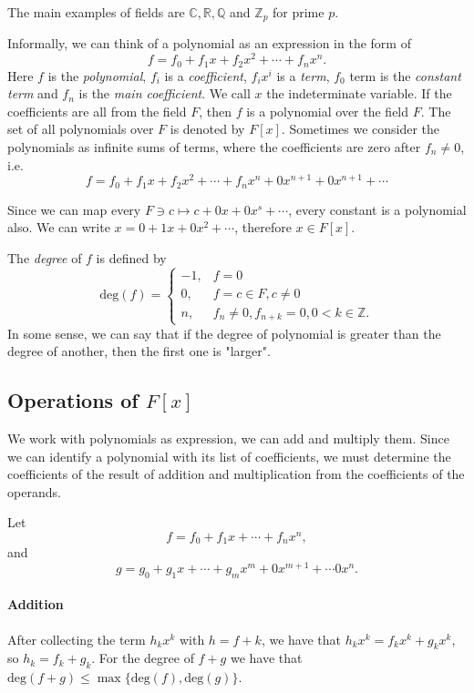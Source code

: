 \documentclass{article}
\newcommand{\Z}{\mathbb{Z}}
\begin{document}
The main examples of fields are $\mathbb{C}, \mathbb{R}, \mathbb{Q}$ and $\Z_p$ for prime $p$.

Informally, we can think of a polynomial as an expression in the form of
\[
    f = f_0 + f_1 x + f_2 x^2 + \cdots + f_n x^n.
\]
Here $f$ is the \emph{polynomial}, $f_i$ is a \emph{coefficient}, $f_i x^i$ is a \emph{term}, $f_0$ term is the \emph{constant term} and $f_n$ is the \emph{main coefficient}.
We call $x$ the indeterminate variable. If the coefficients are all from the field $F$, then $f$ is a polynomial over the field $F$.
The set of all polynomials over $F$ is denoted by $F[x]$. 
Sometimes we consider the polynomials as infinite sums of terms, where the coefficients are zero after $f_n \neq 0$, i.e.
\[
    f = f_0 + f_1 x + f_2 x^2 + \cdots + f_n x^n + 0x^{n+1} + 0x^{n+1} + \cdots
\]

Since we can map every $F \ni c \mapsto c + 0x + 0x^s + \cdots$, every constant is a polynomial also.
We can write $x = 0 + 1x + 0x^2 + \cdots$, therefore $x \in F[x]$.

The \emph{degree} of $f$ is defined by
\[
    \mathrm{deg}(f) = \begin{cases}
        -1, & f = 0 \\
        0, & f = c \in F, c \neq 0 \\
        n, & f_n \neq 0, f_{n+k} = 0, 0 < k \in \Z.
    \end{cases}
\]
In some sense, we can say that if the degree of polynomial is greater than the degree of another, then the first one is "larger".

\subsection{Operations of $F[x]$}

We work with polynomials as expression, we can add and multiply them.
Since we can identify a polynomial with its list of coefficients, we must determine the coefficients of the result of addition and multiplication from the coefficients of the operands.

Let 
\[
    f = f_0 + f_1 x + \cdots + f_n x^n,
\]
and
\[
    g = g_0 + g_1 x + \cdots + g_m x^m + 0x^{m+1} + \cdots 0x^n.
\]

\paragraph{Addition}
After collecting the term $h_k x^k$ with $h=f+k$, we have that $h_k x^k = f_k x^k + g_k x^k$, so $h_k = f_k + g_k$.
For the degree of $f+g$ we have that $\mathrm{deg}(f+g) \le \max \{ \mathrm{deg}(f), \mathrm{deg}(g) \}$.
\end{document}
